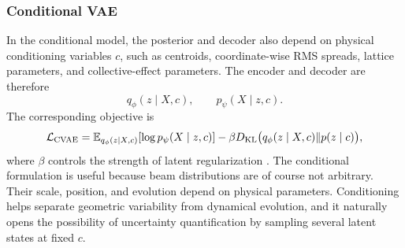 \subsubsection{Conditional VAE}
In the conditional model, the posterior and decoder also depend on physical conditioning variables $c$, such as centroids, coordinate-wise RMS spreads, lattice parameters, and collective-effect parameters. The encoder and decoder are therefore
\begin{equation}
    q_{\phi}(z\mid X,c),\qquad p_{\psi}(X\mid z,c).
\end{equation}
The corresponding objective is
\begin{equation}
    \mathcal{L}_{\mathrm{CVAE}}=\mathbb{E}_{q_{\phi}(z\mid X,c)}[\log p_{\psi}(X\mid z,c)]-\beta D_{\mathrm{KL}}\big(q_{\phi}(z\mid X,c)\|p(z\mid c)\big),
    \label{eq:cvae_elbo_revised}
\end{equation}
where $\beta$ controls the strength of latent regularization \cite{sohn_cvae_2015}. The conditional formulation is useful because beam distributions are of course not arbitrary. Their scale, position, and evolution depend on physical parameters. Conditioning helps separate geometric variability from dynamical evolution, and it naturally opens the possibility of uncertainty quantification by sampling several latent states at fixed $c$.
